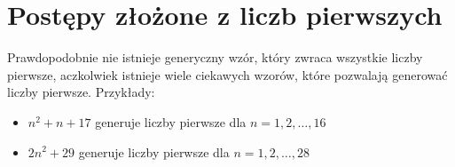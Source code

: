 \documentclass[10pt,onecolumn]{article}
\theoremstyle{definition}
\theoremstyle{hypothesis}
\theoremstyle{capability}
\begin{document}
\section{Postępy złożone z liczb pierwszych}

Prawdopodobnie nie istnieje generyczny wzór, który zwraca wszystkie liczby pierwsze, aczkolwiek istnieje wiele ciekawych wzorów, które pozwalają generować liczby pierwsze. Przykłady:

\begin{itemize}
\item $n^2 + n + 17$ generuje liczby pierwsze dla $n=1, 2, \dots, 16$
\item $2n^2 + 29$ generuje liczby pierwsze dla $n=1, 2, \dots, 28$
\end{itemize}

\newpage

\end{document}
